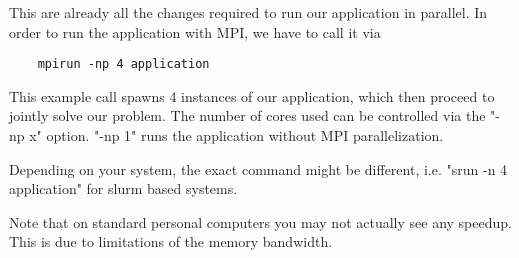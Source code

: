 This are already all the changes required to run our application in parallel. In order to run the application with MPI, we have to call it via 
\begin{verbatim}
	mpirun -np 4 application
\end{verbatim}
This example call spawns 4 instances of our application, which then proceed to jointly solve our problem. The number of cores used can be controlled via the "-np x" option. "-np 1" runs the application without MPI parallelization.

\begin{remark}
	Depending on your system, the exact command might be different, i.e. "srun -n 4 application" for slurm based systems.
\end{remark}

\begin{remark}
	Note that on standard personal computers you may not actually see any speedup. This is due to limitations of the memory bandwidth. 
\end{remark}